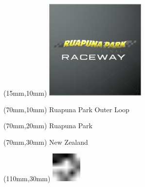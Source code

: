 \null\newpage
\begin{textblock*}{50mm}(15mm,10mm)%
\includegraphics[width=50mm]{LG/RUPU.png}
\end{textblock*}
\begin{textblock*}{130mm}(70mm,10mm)%
{\fontsize{20}{20}\selectfont Ruapuna Park Outer Loop}\\
\end{textblock*}
\begin{textblock*}{120mm}(70mm,20mm)%
{\fontsize{16}{16}\selectfont Ruapuna Park}\\
\end{textblock*}
\begin{textblock*}{120mm}(70mm,30mm)%
{\fontsize{12}{12}\selectfont New Zealand}
\end{textblock*}
\begin{textblock*}{30mm}(110mm,30mm)%
\centering
\includegraphics[height=15mm]{icons/fa-rotate-left.pdf}
\end{textblock*}
